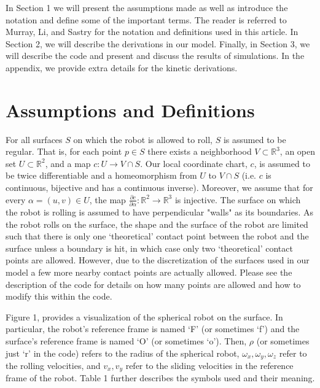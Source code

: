 \documentclass[journal]{IEEEtran}
\begin{document}
In Section 1 we will present the assumptions made as well as introduce the notation and define some of the important terms. The reader is referred to Murray, Li, and Sastry \cite{book} for the notation and definitions used in this article. In Section 2, we will describe the derivations in our model. Finally, in Section 3, we will describe the code and present and discuss the results of simulations. In the appendix, we provide extra details for the kinetic derivations.

\section{Assumptions and Definitions}

For all surfaces $S$ on which the robot is allowed to roll, $S$ is assumed to be regular. That is, for each point $p \in S$ there exists a neighborhood $V \subset \mathbb{R}^3$, an open set $U \subset \mathbb{R}^2$, and a map $c : U \rightarrow V \cap S$. Our local coordinate chart, $c$, is assumed to be twice differentiable and a homeomorphism from $U$ to $V \cap S$ (i.e. $c$ is continuous, bijective and has a continuous inverse). Moreover, we 
assume that for every $ \alpha = (u,v) \in U$, the map $\frac{\partial c}{\partial \alpha}: \mathbb{R}^2 \rightarrow \mathbb{R}^3$ is injective. The surface on which the robot is rolling is assumed to have perpendicular "walls" as its boundaries. As the robot rolls on the surface, the shape and the surface of the robot are limited such that there is only one `theoretical' contact point between the robot and the surface unless a boundary is hit, in which case only two `theoretical' contact points are allowed. However, due to the discretization of the surfaces used in our model a few more nearby contact points are actually allowed. Please see the description of the code for details on how many points are allowed and how to modify this within the code.

Figure 1, provides a visualization of the spherical robot on the surface. In particular, the robot's reference frame is named `F' (or sometimes `f') and the surface's reference frame is named `O' (or sometimes `o'). Then, $\rho$ (or sometimes just `r' in the code) refers to the radius of the spherical robot, $\omega_x,\omega_y,\omega_z$ refer to the rolling velocities, and $v_x,v_y$ refer to the sliding velocities in the reference frame of the robot. Table 1 further describes the symbols used and their meaning.
\end{document}
